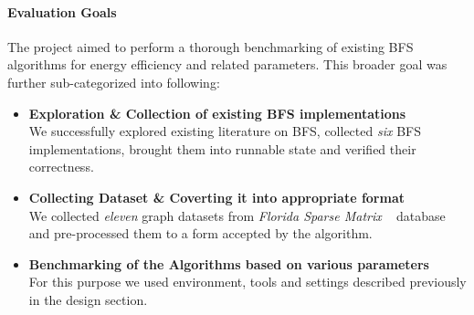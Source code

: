 \paragraph{Evaluation Goals} The project aimed to perform a thorough
benchmarking of existing BFS algorithms for energy efficiency and
related parameters. This broader goal was further sub-categorized into
following:
\begin{itemize}
\item
\textbf{Exploration \& Collection of existing BFS implementations}\\
We successfully explored existing literature on BFS, collected
\emph{six} BFS implementations, brought them into runnable state and
verified their correctness.
\item
\textbf{Collecting Dataset \& Coverting it into appropriate format}\\
We collected \emph{eleven} graph datasets from \emph{Florida Sparse
Matrix} ~\cite{FLORIDA-SPARSE} database and pre-processed them to a
form accepted by the algorithm.
\item
\textbf{Benchmarking of the Algorithms based on various parameters}\\
For this purpose we used environment, tools and settings described
previously in the design section.
\end{itemize}

